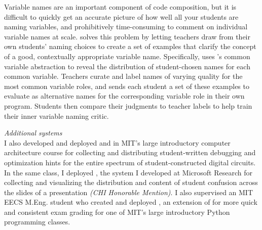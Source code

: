 \documentclass[justified]{tufte-handout}
\begin{document}
Variable names are an important component of code composition, but it is difficult to quickly get an accurate picture of how well all your students are naming variables, and prohibitively time-consuming to comment on individual variable names at scale.  solves this problem by letting teachers draw from their own students' naming choices to create a set of examples that clarify the concept of a good, contextually appropriate variable name.\cite{foobaz} Specifically,  uses 's common variable abstraction to reveal the distribution of student-chosen names for each common variable. Teachers curate and label names of varying quality for the most common variable roles, and  sends each student a set of these examples to evaluate as alternative names for the corresponding variable role in their own program. Students then compare their judgments to teacher labels to help train their inner variable naming critic. %

\newpage
\noindent
\emph{Additional systems}\\
I also developed and deployed  and  in MIT's large introductory computer architecture course for collecting and distributing student-written debugging and optimization hints for the entire spectrum of student-constructed digital circuits.\cite{cscw16} In the same class, I deployed , the system I developed at Microsoft Research for collecting and visualizing the distribution and content of student confusion across the slides of a presentation \emph{(CHI Honorable Mention)}.\cite{mudslide} I also supervised an MIT EECS M.Eng. student who created and deployed , an extension of  for more quick and consistent exam grading for one of MIT's large introductory Python programming classes.\cite{grovercode}





\end{document}
